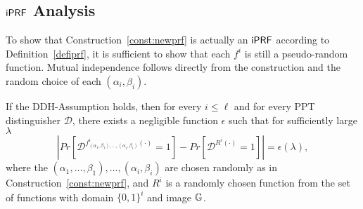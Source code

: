 \subsection{$\mathsf{i}\mathsf{PRF}$ Analysis}\label{sec:iprf-analysis}
To show that Construction~\ref{const:newprf} is actually an $\mathsf{i}\mathsf{PRF}$ according to
Definition~\ref{defiprf}, it is sufficient to show that each $f^i$ is
still a pseudo-random function. Mutual independence follows directly from the construction and the random choice of each $(\alpha_i,\beta_i)$.

\begin{theorem}
\label{theorem:newprf}
If the DDH-Assumption holds, then for every $i\leq\ell$ and for every
PPT distinguisher $\mathcal{D}$, there exists a negligible function
$\epsilon$ such that for sufficiently large $\lambda$
$$|
Pr[\mathcal{D}^{f^i_{(\alpha_1,\beta_1),\ldots,(\alpha_i,\beta_i)}(\cdot)}=1]
- Pr[\mathcal{D}^{R^i(\cdot)} = 1]| =\epsilon(\lambda), $$ where the
$(\alpha_1,\ldots, \beta_1),\ldots,(\alpha_i,\beta_i)$ are chosen randomly as
in Construction~\ref{const:newprf}, and $R^i$ is a randomly chosen
function from the set of functions with domain $\{0,1\}^i$ and image
$\mathbb{G}$.
\end{theorem}

